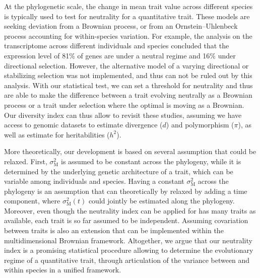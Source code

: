 \documentclass{article}
\newcommand{\Heredity}{h^2}
\newcommand{\RateMut}{\sigma^2_{\mathrm{M}}}
\begin{document}
At the phylogenetic scale, the change in mean trait value across different species is typically used to test for neutrality for a quantitative trait.
These models are seeking deviation from a Brownian process\cite{catalan_drift_2019}, or from an Ornstein–Uhlenbeck process accounting for within-species variation\cite{rohlfs_phylogenetic_2015}.
For example, the analysis on the transcriptome across different individuals and species concluded that the expression level of 81\% of genes are under a neutral regime and 16\% under directional selection\cite{catalan_drift_2019}.
However, the alternative model of a varying directional or stabilizing selection was not implemented, and thus can not be ruled out by this analysis.
With our statistical test, we can set a threshold for neutrality and thus are able to make the difference between a trait evolving neutrally as a Brownian process or a trait under selection where the optimal is moving as a Brownian.
Our diversity index can thus allow to revisit these studies, assuming we have access to genomic datasets to estimate divergence ($d$) and polymorphism ($\pi$), as well as estimate for heritabilities ($\Heredity$).


More theoretically, our development is based on several assumption that could be relaxed.
First, $\RateMut$ is assumed to be constant across the phylogeny, while it is determined by the underlying genetic architecture of a trait, which can be variable among individuals and species.
Having a constant $\RateMut$ across the phylogeny is an assumption that can theoretically by relaxed by adding a time component\cite{arnold_understanding_2008, hohenlohe_mipod_2008}, where $\RateMut(t)$ could jointly be estimated along the phylogeny\cite{kostikova_bridging_2016, gaboriau_multiplatform_2020}.
Moreover, even though the neutrality index can be applied for has many traits as available, each trait is so far assumed to be independent.
Assuming covariation between traits is also an extension that can be implemented within the multidimensional Brownian framework\cite{huelsenbeck_detecting_2003, lartillot_phylogenetic_2011, lartillot_joint_2012}.
Altogether, we argue that our neutrality index is a promising statistical procedure allowing to determine the evolutionary regime of a quantitative trait, through articulation of the variance between and within species in a unified framework.
\end{document}
